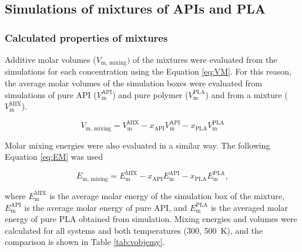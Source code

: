 \subsection{Simulations of mixtures of APIs and PLA}
\subsubsection{Calculated properties of mixtures}
Additive molar volumes ($V_{\text{m, mixing}})$ of the mixtures were evaluated from the simulations for each concentration using the Equation \ref{eq:VM}. For this reason, the average molar volumes of the simulation boxes were evaluated from simulations of pure API ($V_{\text{m}}^{\text{API}} $) and pure polymer ($V_{\text{m}}^{\text{PLA}}$) and from a mixture ($V_{\text{m}}^{\text{MIX}}$).

\begin{equation}\label{eq:VM}
	V_{\text{m, mixing}} = V_{\text{m}}^{\text{MIX}} - x_{\text{API}} V_{\text{m}}^{\text{API}} - x_{\text{PLA}} V_{\text{m}}^{\text{PLA}}
\end{equation}

Molar mixing energies were also evaluated in a similar way. The following Equation \ref{eq:EM} was used

\begin{equation}\label{eq:EM}
	E_{\text{m, mixing}} = E_{\text{m}}^{\text{MIX}} - x_{\text{API}} E_{\text{m}}^{\text{API}} - x_{\text{PLA}} E_{\text{m}}^{\text{PLA}},
\end{equation}

where $E_{\text{m}}^{\text{MIX}}$ is the average molar energy of the simulation box of the mixture, $E_{\text{m}}^{\text{API}}$ is the average molar energy of pure API, and $E_{\text{m}}^{\text{PLA}}$ is the averaged molar energy of pure PLA obtained from simulation. Mixing energies and volumes were calculated for all systems and both temperatures (300, 500~K), and the comparison is shown in Table \ref{tab:vobjemy}.  

